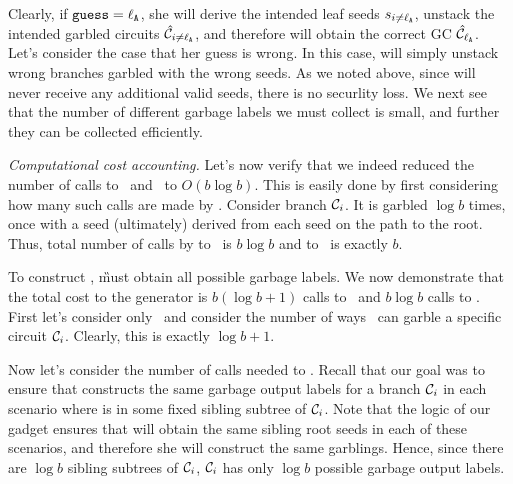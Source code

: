 Clearly, if $\mathtt{guess}=\mathtt{\ell_{A}}$, she will derive the intended leaf seeds $s_{i\neq\mathtt{\ell_{A}}}$, unstack the intended garbled circuits $\hat{\mathcal C}_{i\neq\mathtt{\ell_{A}}}$, and therefore will obtain the correct GC $\hat{\mathcal C}_\mathtt{\ell_{A}}$.   Let's consider the case that her guess is wrong. %
In this case, \E will simply unstack wrong branches garbled with the wrong seeds.  As we noted above, since \E will never receive any additional valid seeds, there is no securlity loss.  We next see that the number of different garbage labels we must collect is small, and further they can be collected efficiently.







{\em Computational cost accounting.} Let's now verify that we indeed reduced the number of calls to \Gb\ and \Ev\ to $O(b \log b)$.  This is easily done by first considering how many such calls are made by \E.  
Consider branch $\mathcal C_i$.  It is garbled $\log b$ times, once with a seed (ultimately) derived from each seed on the path to the root.   Thus, total number of calls by \E to \Gb\ is $b \log b$ and to \Ev\ is exactly $b$.  




To construct \gadget, \G must obtain all possible garbage labels. 
We now demonstrate that the total cost to the generator is $b (\log b + 1)$ calls to \Gb\ and $b \log b$ calls to \Ev.
First let’s consider only \Gb\ and consider the number of ways \E\ can garble a specific circuit $\mathcal C_i$. Clearly, this is exactly $\log b+1$.

Now let’s consider the number of calls needed to \Ev.
Recall that our goal was to ensure that \E constructs the same garbage output labels for a branch $\mathcal C_i$ in each scenario where \aid is in some fixed sibling subtree of $\mathcal C_i$. Note that the logic of our gadget ensures that \E will obtain the same sibling root seeds in each of these scenarios, and therefore she will construct the same garblings. Hence, since there are $\log b$ sibling subtrees of $\mathcal C_i$, $\mathcal C_i$ has only $\log b$ possible garbage output labels.






















